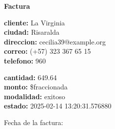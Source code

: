 \documentclass{article}
\begin{document}
\begin{center}
    {\LARGE \textbf{Factura}}\\[1cm]
\end{center}

\textbf{cliente:} La Virginia \\
\textbf{ciudad:} Risaralda \\
\textbf{direccion:} cecilia39@example.org \\
\textbf{correo:} (+57) 323 367 65 15 \\
\textbf{telefono:} 960 \\

\vspace{0.5cm}

\textbf{cantidad:} 649.64 \\
\textbf{monto:} \$fraccionada \\
\textbf{modalidad:} exitoso \\
\textbf{estado:} 2025-02-14 13:20:31.576880 \\

\vspace{1cm}

Fecha de la factura: 
\end{document}
